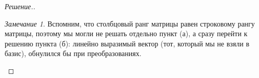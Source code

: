 \documentclass[a4paper]{article}
\theoremstyle{remark}
\newtheorem{remark}{Замечание}
\begin{document}
\begin{proof}[Решение.]
        \begin{remark}
          Вспомним, что столбцовый ранг матрицы равен строковому рангу матрицы, поэтому
          мы могли не решать отдельно пункт (а), а сразу перейти к решению пункта (б): 
          линейно выразимый вектор (тот, который мы не взяли в базис), обнулился бы при
          преобразованиях.
        \end{remark}
      \end{proof}
\end{document}
